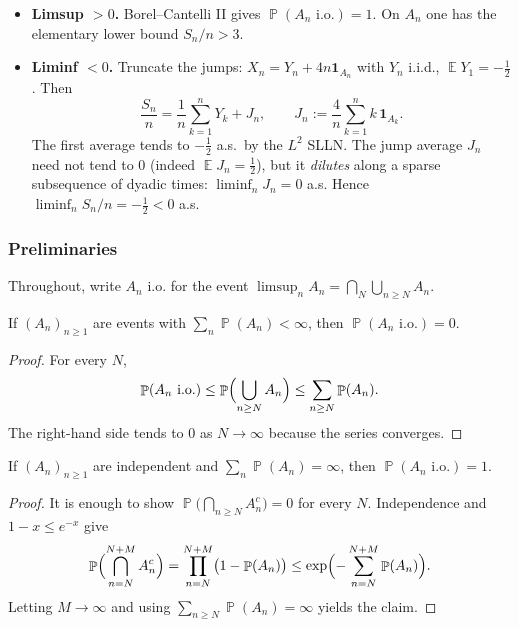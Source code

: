 \documentclass[11pt,a4paper]{article}
\DeclareMathOperator{\E}{\mathbb{E}}
\DeclareMathOperator{\Pbb}{\mathbb{P}}
\begin{document}
\begin{itemize}
    \item \textbf{Limsup \(>0\).} Borel--Cantelli II gives \(\Pbb(A_n\text{ i.o.})=1\). On \(A_n\) one has the elementary lower bound \(S_n/n>3\).
    \item \textbf{Liminf \(<0\).} Truncate the jumps: \(X_n=Y_n+4n\mathbf{1}_{A_n}\) with \(Y_n\) i.i.d., \(\E Y_1=-\tfrac12\). Then
    \[
    \frac{S_n}{n}
    =
    \frac1n\sum_{k=1}^n Y_k
    +
    J_n,
    \qquad
    J_n:=\frac4n\sum_{k=1}^n k\,\mathbf{1}_{A_k}.
    \]
    The first average tends to \(-\tfrac12\) a.s.\ by the \(L^2\) SLLN. The jump average \(J_n\) need not tend to \(0\) (indeed \(\E J_n=\tfrac12\)), but it \emph{dilutes} along a sparse subsequence of dyadic times: \(\liminf_n J_n=0\) a.s. Hence \(\liminf_n S_n/n=-\tfrac12<0\) a.s.
\end{itemize}

\subsubsection{Preliminaries}

Throughout, write \(A_n\text{ i.o.}\) for the event \(\limsup_n A_n=\bigcap_N\bigcup_{n\ge N}A_n\).

\begin{lemma}
\label{lem:p4-bc1}
If \((A_n)_{n\ge 1}\) are events with \(\sum_n\Pbb(A_n)<\infty\), then \(\Pbb(A_n\text{ i.o.})=0\).
\end{lemma}

\begin{proof}
For every \(N\),
\[
\Pbb(A_n\text{ i.o.})
\le
\Pbb\Bigl(\bigcup_{n\ge N}A_n\Bigr)
\le
\sum_{n\ge N}\Pbb(A_n).
\]
The right-hand side tends to \(0\) as \(N\to\infty\) because the series converges.
\end{proof}

\begin{lemma}
\label{lem:p4-bc2}
If \((A_n)_{n\ge 1}\) are independent and \(\sum_n\Pbb(A_n)=\infty\), then \(\Pbb(A_n\text{ i.o.})=1\).
\end{lemma}

\begin{proof}
It is enough to show \(\Pbb\bigl(\bigcap_{n\ge N}A_n^c\bigr)=0\) for every \(N\). Independence and \(1-x\le e^{-x}\) give
\[
\Pbb\Bigl(\bigcap_{n=N}^{N+M}A_n^c\Bigr)
=
\prod_{n=N}^{N+M}\bigl(1-\Pbb(A_n)\bigr)
\le
\exp\Bigl(-\sum_{n=N}^{N+M}\Pbb(A_n)\Bigr).
\]
Letting \(M\to\infty\) and using \(\sum_{n\ge N}\Pbb(A_n)=\infty\) yields the claim.
\end{proof}
\end{document}
